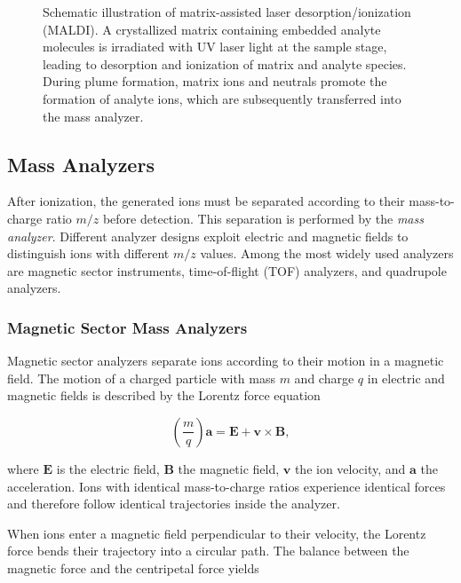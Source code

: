 \begin{figure}[H]
    \centering
    
    \caption[Schematic of MALDI ionization]{
        Schematic illustration of matrix-assisted laser desorption/ionization (MALDI).
        A crystallized matrix containing embedded analyte molecules is irradiated with UV laser light at the sample stage, leading to desorption and ionization of matrix and analyte species.
        During plume formation, matrix ions and neutrals promote the formation of analyte ions, which are subsequently transferred into the mass analyzer.
    }
    \label{fig:maldi-schematic}
    \cite[p.~42]{Rockwood2018}
\end{figure}

\subsection{Mass Analyzers}

After ionization, the generated ions must be separated according to their mass-to-charge ratio $m/z$ before detection.
This separation is performed by the \textit{mass analyzer}. \cite[pp.~5-6]{Dass2007}
Different analyzer designs exploit electric and magnetic fields to distinguish ions with different $m/z$ values.
Among the most widely used analyzers are magnetic sector instruments, time-of-flight (TOF) analyzers, and quadrupole analyzers. \cite[pp.~108-109]{Dass2007}

\subsubsection{Magnetic Sector Mass Analyzers}

Magnetic sector analyzers separate ions according to their motion in a magnetic field.
The motion of a charged particle with mass $m$ and charge $q$ in electric and magnetic fields is described by the Lorentz force equation

\[
\left(\frac{m}{q}\right)\mathbf{a} = \mathbf{E} + \mathbf{v} \times \mathbf{B},
\]

where $\mathbf{E}$ is the electric field, $\mathbf{B}$ the magnetic field, $\mathbf{v}$ the ion velocity, and $\mathbf{a}$ the acceleration.
Ions with identical mass-to-charge ratios experience identical forces and therefore follow identical trajectories inside the analyzer.

When ions enter a magnetic field perpendicular to their velocity, the Lorentz force bends their trajectory into a circular path.
The balance between the magnetic force and the centripetal force yields

